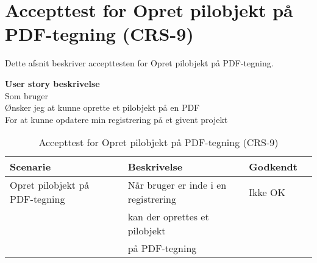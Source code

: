 \section{Accepttest for Opret pilobjekt på PDF-tegning (CRS-9)}
Dette afsnit beskriver accepttesten for Opret pilobjekt på PDF-tegning.

\textbf{User story beskrivelse} \\
Som bruger \\
Ønsker jeg at kunne oprette et pilobjekt på en PDF \\
For at kunne opdatere min registrering på et givent projekt

\begin{table}[H]
	\centering
	\begin{tabular}{|ll|l|ll|} \hline
		\textbf{Scenarie} &  & \textbf{Beskrivelse}&  \textbf{Godkendt}&  \\ \hline
		Opret pilobjekt på PDF-tegning&  &  Når bruger er inde i en registrering &  Ikke OK&  \\
		& & kan der oprettes et pilobjekt& & \\ 
		& & på PDF-tegning& & \\ \hline
	\end{tabular}
	\caption{Accepttest for Opret pilobjekt på PDF-tegning (CRS-9)}
	\label{AcceptPil}
\end{table}
